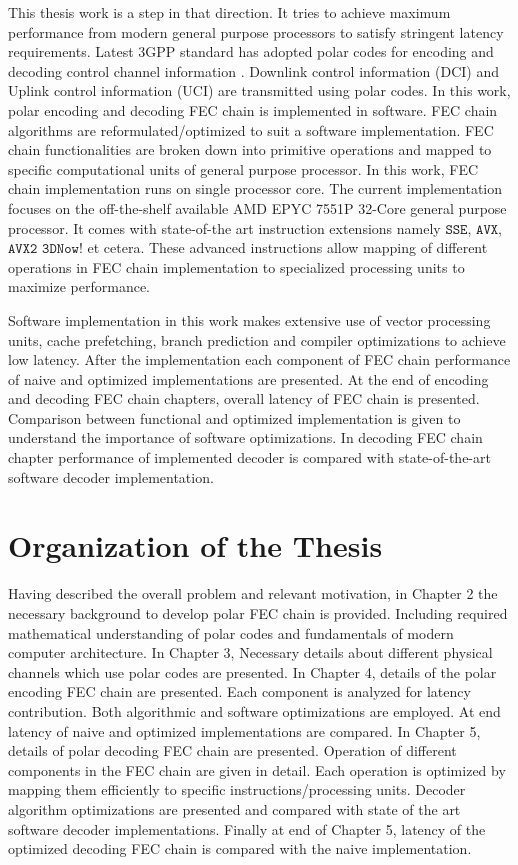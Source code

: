 This thesis work is a step in that direction. It tries to achieve maximum performance from modern general purpose processors to satisfy stringent latency requirements. Latest 3GPP standard has adopted polar codes for encoding and decoding control channel information \cite{3gpp.38.212}. Downlink control information (DCI) and Uplink control information (UCI) are transmitted using polar codes. In this work, polar encoding and decoding FEC chain is implemented in software. FEC chain algorithms are reformulated/optimized to suit a software implementation. FEC chain functionalities are broken down into primitive operations and mapped to specific computational units of general purpose processor. In this work, FEC chain implementation runs on single processor core. The current implementation focuses on the off-the-shelf available AMD EPYC 7551P 32-Core general purpose processor\cite{amdEpyc}. It comes with state-of-the art instruction extensions namely $\mathtt{SSE}$, $\mathtt{AVX}$, $\mathtt{AVX2}$ $\mathtt{3DNow!}$ et cetera. These advanced instructions allow mapping of different operations in FEC chain implementation to specialized processing units to maximize performance. 

Software implementation in this work makes extensive use of vector processing units, cache prefetching, branch prediction and compiler optimizations to achieve low latency. After the implementation each component of FEC chain performance of naive and optimized implementations are presented. At the end of encoding and decoding FEC chain chapters, overall latency of FEC chain  is presented. Comparison between functional and optimized implementation is given to understand the importance of software optimizations. In decoding FEC chain chapter performance of implemented decoder is compared with state-of-the-art software decoder implementation\cite{lowLatencySWPolarDec}.

\section*{Organization of the Thesis}
Having described the overall problem and relevant motivation, in Chapter 2 the necessary background to develop polar FEC chain is provided. Including required mathematical understanding of polar codes and fundamentals of modern computer architecture. In Chapter 3, Necessary details about different physical channels which use polar codes are presented. In Chapter 4, details of the polar encoding FEC chain are presented. Each component is analyzed for latency contribution. Both algorithmic and software optimizations are employed. At end latency of naive and optimized implementations are compared. In Chapter 5, details of polar decoding FEC chain are presented. Operation of different components in the FEC chain are given in detail. Each operation is optimized by mapping them efficiently to specific instructions/processing units. Decoder algorithm optimizations are presented and compared with state of the art software decoder implementations. Finally at end of Chapter 5, latency of the optimized decoding FEC chain is compared with the naive implementation.